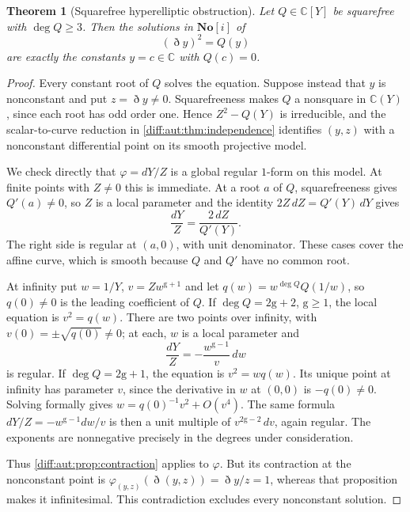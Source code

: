 \documentclass[11pt,letterpaper]{article}
\numberwithin{equation}{section}
\newtheorem{theorem}{Theorem}[section]
\theoremstyle{definition}
\theoremstyle{remark}
\newcommand{\SC}{\mathbf{No}[i]}
\newcommand{\C}{\mathbb C}
\newcommand{\Dn}{\eth}
\begin{document}
\begin{theorem}[Squarefree hyperelliptic obstruction]
\label{diff:aut:thm:hyperelliptic}
Let $Q\in\C[Y]$ be squarefree with $\deg Q\geq3$. Then the solutions in $\SC$ of
\begin{equation}\label{diff:aut:eq:hyperelliptic}
 (\Dn y)^{2}=Q(y)
\end{equation}
are exactly the constants $y=c\in\C$ with $Q(c)=0$.
\end{theorem}
\begin{proof}
Every constant root of $Q$ solves the equation. Suppose instead that
$y$ is nonconstant and put $z=\Dn y\neq0$.
Squarefreeness makes $Q$ a nonsquare in $\C(Y)$, since each root
has odd order one. Hence $Z^2-Q(Y)$ is irreducible, and the
scalar-to-curve reduction in \cref{diff:aut:thm:independence}
identifies $(y,z)$ with a nonconstant differential point on its
smooth projective model.

We check directly that $\varphi=dY/Z$ is a global regular
$1$-form on this model. At finite points with $Z\neq0$ this is
immediate. At a root $a$ of $Q$, squarefreeness gives $Q'(a)\neq0$,
so $Z$ is a local parameter and the identity
$2Z\,dZ=Q'(Y)\,dY$ gives
\[
 \frac{dY}{Z}=\frac{2\,dZ}{Q'(Y)}.
\]
The right side is regular at $(a,0)$, with unit denominator.
These cases cover the affine curve, which is smooth because
$Q$ and $Q'$ have no common root.

At infinity put $w=1/Y$, $v=Z w^{\mathrm g+1}$ and let
$q(w)=w^{\deg Q}Q(1/w)$, so $q(0)\neq0$ is the leading coefficient
of $Q$. If $\deg Q=2\mathrm g+2$, $\mathrm g\geq1$, the local
equation is $v^2=q(w)$. There are two points over infinity,
with $v(0)=\pm\sqrt{q(0)}\neq0$; at each, $w$ is a local
parameter and
\[
 \frac{dY}{Z}=-\frac{w^{\mathrm g-1}}{v}\,dw
\]
is regular. If $\deg Q=2\mathrm g+1$, the equation is
$v^2=wq(w)$. Its unique point at infinity has parameter $v$,
since the derivative in $w$ at $(0,0)$ is $-q(0)\neq0$.
Solving formally gives $w=q(0)^{-1}v^2+O(v^4)$. The same
formula $dY/Z=-w^{\mathrm g-1}dw/v$ is then a unit multiple
of $v^{2\mathrm g-2}\,dv$, again regular. The exponents are
nonnegative precisely in the degrees under consideration.

Thus \cref{diff:aut:prop:contraction} applies to $\varphi$.
But its contraction at the nonconstant point is
$\varphi_{(y,z)}(\Dn(y,z))=\Dn y/z=1$, whereas that proposition
makes it infinitesimal. This contradiction excludes every
nonconstant solution.
\end{proof}
\end{document}
